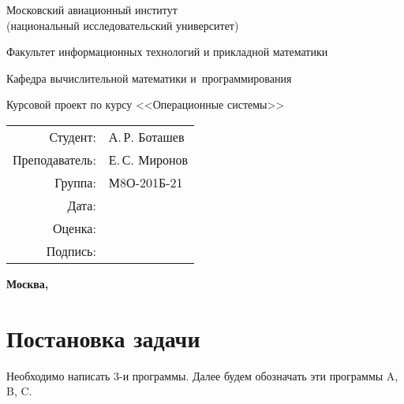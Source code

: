 \documentclass[pdf, unicode, 12pt, a4paper,oneside,fleqn]{article}
\begin{document}
\begin{titlepage}
    \begin{center}
        \bfseries

        {\Large Московский авиационный институт\\ (национальный исследовательский университет)}
        
        \vspace{48pt}
        
        {\large Факультет информационных технологий и прикладной математики}
        
        \vspace{36pt}
        
        {\large Кафедра вычислительной математики и~программирования}
        
        \vspace{48pt}
        
        Курсовой проект по курсу <<Операционные системы>>

    \end{center}
    
    \vspace{140pt}
    
    \begin{flushright}
    \begin{tabular}{rl}
    Студент: & А.\,Р. Боташев \\
    Преподаватель: & Е.\,С. Миронов \\
    Группа: & М8О-201Б-21 \\
    Дата: & \\
    Оценка: & \\
    Подпись: & \\
    \end{tabular}
    \end{flushright}
    
    \vfill
    
    \begin{center}
    \bfseries
    Москва, \the\year
    \end{center}
\end{titlepage}
    
\pagebreak

\section{Постановка задачи}

Необходимо написать 3-и программы. Далее будем обозначать эти программы A, B, C.
\end{document}
